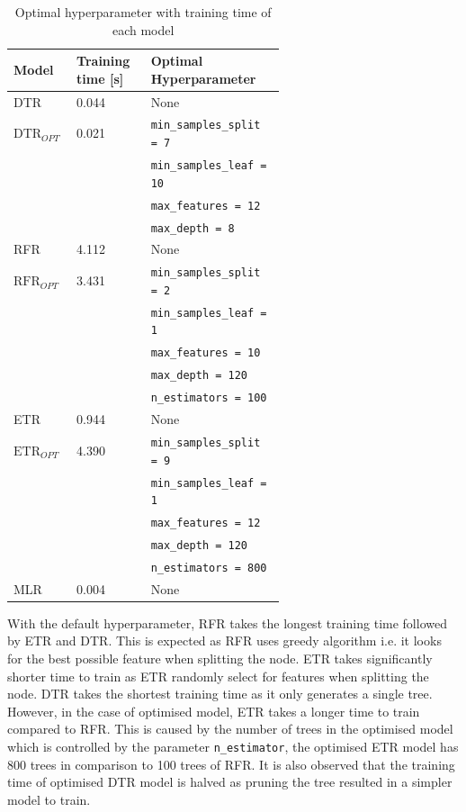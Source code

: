 \begin{table}[ht]
    \footnotesize
    \centering
    {\begin{tabular}{ p{0.1\linewidth} p{0.2\linewidth} p{0.3\linewidth}}
    \hline
    Model & Training time [s] & Optimal Hyperparameter \\
    \hline
    DTR & 0.044 & None \\
    $\text{DTR}_{OPT}$ & 0.021  & {\tt min\_samples\_split = 7}\\
    &&{\tt min\_samples\_leaf = 10}\\
    &&{\tt max\_features = 12}\\
    &&{\tt max\_depth = 8}\\
    RFR & 4.112 & None \\
    $\text{RFR}_{OPT}$ & 3.431  & {\tt min\_samples\_split = 2}\\
    &&{\tt min\_samples\_leaf = 1}\\
    &&{\tt max\_features = 10}\\
    &&{\tt max\_depth = 120}\\
    &&{\tt n\_estimators = 100}\\
    ETR & 0.944 & None \\
    $\text{ETR}_{OPT}$ & 4.390  & {\tt min\_samples\_split = 9}\\
    &&{\tt min\_samples\_leaf = 1}\\
    &&{\tt max\_features = 12}\\
    &&{\tt max\_depth = 120}\\
    &&{\tt n\_estimators = 800}\\
    MLR & 0.004  & None\\
    \hline
    \end{tabular}}
\caption{Optimal hyperparameter with training time of each model}\label{tbl:hpo_optimal}
\end{table}

With the default hyperparameter, RFR takes the longest training time followed by ETR and DTR. This is expected as RFR uses greedy algorithm i.e. it looks for the best possible feature when splitting the node. ETR takes significantly shorter time to train as ETR randomly select for features when splitting the node. DTR takes the shortest training time as it only generates a single tree.\\

However, in the case of optimised model, ETR takes a longer time to train compared to RFR. This is caused by the number of trees in the optimised model which is controlled by the parameter {\tt n\_estimator}, the optimised ETR model has 800 trees in comparison to 100 trees of RFR. It is also observed that the training time of optimised DTR model is halved as pruning the tree resulted in a simpler model to train. \\

